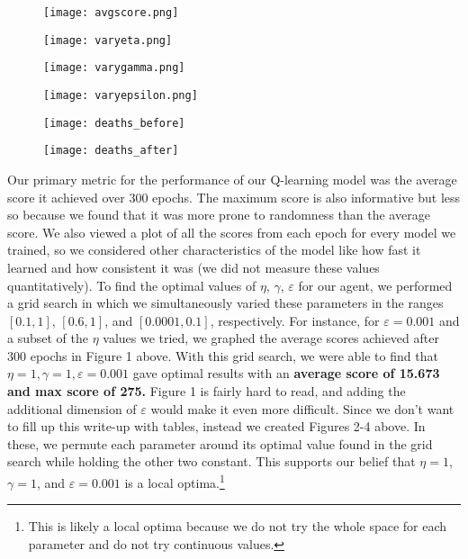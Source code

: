 \documentclass[11pt]{article}
\begin{document}
\begin{figure}[h!]
    \begin{minipage}{0.5\textwidth}
     \centering
     \texttt{[image: avgscore.png]}
     \caption{}
   \end{minipage}\hfill
   \begin{minipage}{0.5\textwidth}
     \centering
     \texttt{[image: varyeta.png]}
     \caption{}
   \end{minipage}\hfill
   \begin{minipage}{0.5\textwidth}
     \centering
     \texttt{[image: varygamma.png]}
     \caption{}
   \end{minipage}
      \begin{minipage}{0.5\textwidth}
     \centering
     \texttt{[image: varyepsilon.png]}
     \caption{}
   \end{minipage}
\end{figure}
\begin{figure}[h!]
   \begin{minipage}{0.5\textwidth}
     \centering
     \texttt{[image: deaths\_before]}
   \end{minipage}\hfill
   \begin{minipage}{0.5\textwidth}
     \centering
     \texttt{[image: deaths\_after]}
   \end{minipage}
   \caption{}
\end{figure}
Our primary metric for the performance of our Q-learning model was the average score it achieved over 300 epochs. The maximum score is also informative but less so because we found that it was more prone to randomness than the average score. We also viewed a plot of all the scores from each epoch for every model we trained, so we considered other characteristics of the model like how fast it learned and how consistent it was (we did not measure these values quantitatively). To find the optimal values of $\eta$, $\gamma$, $\varepsilon$ for our agent, we performed a grid search in which we simultaneously varied these parameters in the ranges $[0.1, 1]$, $[0.6, 1]$, and $[0.0001, 0.1]$, respectively. For instance, for $\varepsilon = 0.001$ and a subset of the $\eta$ values we tried, we graphed the average scores achieved after 300 epochs in Figure 1 above. With this grid search, we were able to find that $\boxed{\eta=1, \gamma=1,\varepsilon=0.001}$ gave optimal results with an \textbf{average score of 15.673 and max score of 275.} Figure 1 is fairly hard to read, and adding the additional dimension of $\varepsilon$ would make it even more difficult. Since we don't want to fill up this write-up with tables, instead we created Figures 2-4 above. In these, we permute each parameter around its optimal value found in the grid search while holding the other two constant. This supports our belief that $\eta=1$, $\gamma=1$, and $\varepsilon=0.001$ is a local optima.\footnote{This is likely a local optima because we do not try the whole space for each parameter and do not try continuous values.}
\end{document}
